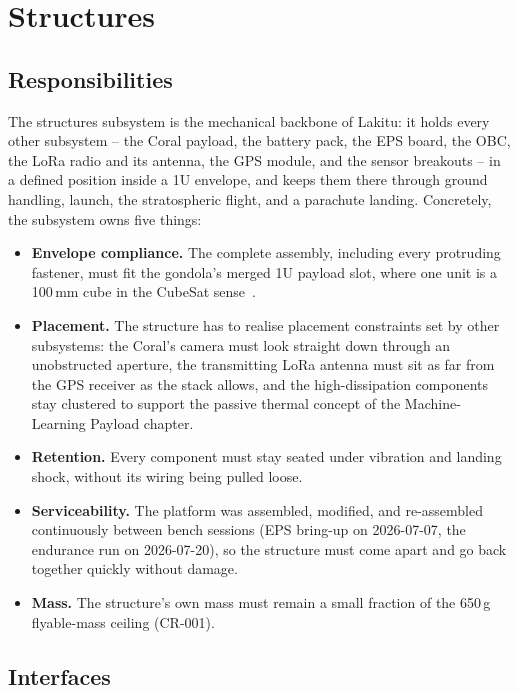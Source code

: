 \chapter{Structures}

\section{Responsibilities}

The structures subsystem is the mechanical backbone of Lakitu: it holds every
other subsystem -- the Coral payload, the battery pack, the EPS board, the
OBC, the LoRa radio and its antenna, the GPS module, and the sensor breakouts
-- in a defined position inside a 1U envelope, and keeps them there through
ground handling, launch, the stratospheric flight, and a parachute landing.
Concretely, the subsystem owns five things:

\begin{itemize}
  \item \textbf{Envelope compliance.} The complete assembly, including every
        protruding fastener, must fit the gondola's merged 1U payload slot,
        where one unit is a 100\,mm cube in the CubeSat
        sense~\cite{cds,kessler}.
  \item \textbf{Placement.} The structure has to realise placement
        constraints set by other subsystems: the Coral's camera must look
        straight down through an unobstructed aperture, the transmitting
        LoRa antenna must sit as far from the GPS receiver as the stack
        allows, and the high-dissipation components stay clustered to
        support the passive thermal concept of the Machine-Learning Payload
        chapter.
  \item \textbf{Retention.} Every component must stay seated under vibration
        and landing shock, without its wiring being pulled loose.
  \item \textbf{Serviceability.} The platform was assembled, modified, and
        re-assembled continuously between bench sessions (EPS bring-up on
        2026-07-07, the endurance run on 2026-07-20), so the structure must
        come apart and go back together quickly without damage.
  \item \textbf{Mass.} The structure's own mass must remain a small fraction
        of the 650\,g flyable-mass ceiling (CR-001).
\end{itemize}

\section{Interfaces}

